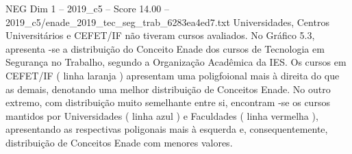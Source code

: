 \begin{textsample}{NEG Dim 1 – 2019\_c5 – Score 14.00 – 2019\_c5/enade\_2019\_tec\_seg\_trab\_6283ea4ed7.txt}
Universidades, Centros Universitários e CEFET/IF não tiveram cursos avaliados.
No Gráfico 5.3, apresenta -se a distribuição do Conceito Enade dos cursos de Tecnologia em Segurança no Trabalho, segundo a Organização Acadêmica da IES.
Os cursos em CEFET/IF ( linha laranja ) apresentam uma poligfoional mais à direita do que as demais, denotando uma melhor distribuição de Conceitos Enade.
No outro extremo, com distribuição muito semelhante entre si, encontram -se os cursos mantidos por Universidades ( linha azul ) e Faculdades ( linha vermelha ), apresentando as respectivas poligonais mais à esquerda e, consequentemente, distribuição de Conceitos Enade com menores valores.

\end{textsample}
